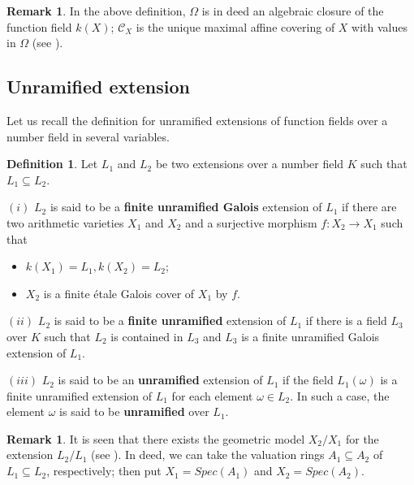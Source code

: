 \documentclass[12pt,twoside,reqno]{amsart}
\theoremstyle{definition}
\newtheorem{definition}[theorem]{Definition}
\newtheorem{remark}[theorem]{Remark}
\numberwithin{equation}{section}
\begin{document}
\begin{remark}
In the above definition, $\Omega$ is in deed an algebraic closure of the function field $k(X)$; $\mathcal{C}_{X}$ is the unique maximal affine covering of $X$ with values in $\Omega$ (see \cite{An7}).
\end{remark}

\subsection{Unramified extension}

Let us recall the definition for unramified extensions of function fields over a number field in several variables.

\begin{definition}
Let $L_{1}$ and $L_{2}$ be two extensions over a number field $K$
such that $L_{1}\subseteq L_{2}$.

$\left( i\right) $ $L_{2}$ is said to be a \textbf{finite unramified Galois}
extension of $L_{1}$ if there are two arithmetic varieties $X_{1}$ and $
X_{2} $ and a surjective morphism $f:X_{2}\rightarrow X_{1}$ such that

\begin{itemize}
\item $k\left( X_{1}\right) =L_{1},k\left( X_{2}\right) =L_{2}$;

\item $X_{2}$ is a finite \'{e}tale Galois cover of $X_{1}$ by $f$.
\end{itemize}

$\left( ii\right) $ $L_{2}$ is said to be a \textbf{finite unramified}
extension of $L_{1}$ if there is a field $L_{3}$ over $K$ such that $L_{2}$
is contained in $L_{3}$ and $L_{3}$ is a finite unramified Galois extension
of $L_{1}.$

$\left( iii\right) $ $L_{2}$ is said to be an \textbf{unramified} extension
of $L_{1}$ if the field $L_{1}(\omega)$ is a finite unramified extension of $
L_{1}$ for each element $\omega \in L_{2}$. In such a case, the element $
\omega$ is said to be \textbf{unramified} over $L_{1}$.
\end{definition}

\begin{remark}
It is seen that there exists the geometric model $X_{2}/X_{1}$ for the extension $L_{2}/L_{1}$ (see \cite{An3}). In deed, we can take the valuation rings $A_{1}\subseteq A_{2}$ of $L_{1}\subseteq L_{2}$, respectively; then put $X_{1}=Spec(A_{1})$ and $X_{2}=Spec(A_{2})$.
\end{remark}
\end{document}
